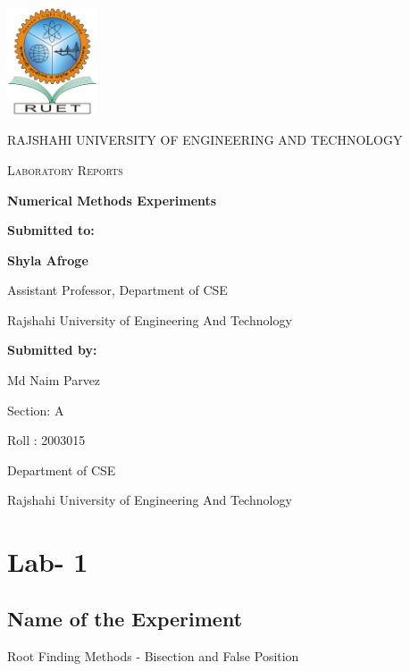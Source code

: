 \documentclass{article}
\begin{document}
\begin{titlepage}
    \centering
    \includegraphics[width=0.2\textwidth]{ruet-monogram.png} \par
    \vspace{1cm}
    {\scshape\LARGE RAJSHAHI UNIVERSITY OF ENGINEERING AND TECHNOLOGY \par}
    \vspace{1cm}
    {\scshape\Large Laboratory Reports\par}
    \vspace{1.5cm}
    {\huge\bfseries Numerical Methods Experiments\par}
    \vspace{2cm}
    \textbf{Submitted to:}\par
    \textbf{Shyla Afroge} \par
    Assistant Professor, Department of CSE \par
    Rajshahi University of Engineering And Technology\par
    \vspace{1cm}
    \textbf{Submitted by:}\par
    Md Naim Parvez \par
    Section: A\par
    Roll : 2003015 \par
    Department of CSE \par
    Rajshahi University of Engineering And Technology\par
    
    \vspace*{\fill}
\end{titlepage}

\section*{\centering Lab- 1}

\subsection*{Name of the Experiment}
Root Finding Methods - Bisection and False Position
\end{document}
